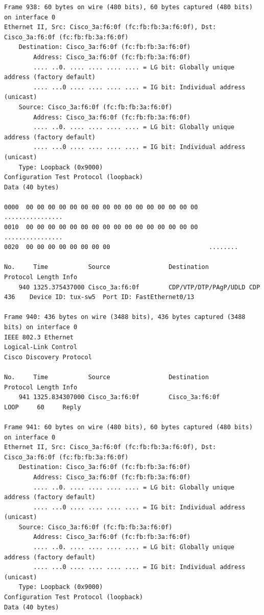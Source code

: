 \documentclass[a4paper,11pt]{article}
\begin{document}
\begin{lstlisting}
Frame 938: 60 bytes on wire (480 bits), 60 bytes captured (480 bits) on interface 0
Ethernet II, Src: Cisco_3a:f6:0f (fc:fb:fb:3a:f6:0f), Dst: Cisco_3a:f6:0f (fc:fb:fb:3a:f6:0f)
    Destination: Cisco_3a:f6:0f (fc:fb:fb:3a:f6:0f)
        Address: Cisco_3a:f6:0f (fc:fb:fb:3a:f6:0f)
        .... ..0. .... .... .... .... = LG bit: Globally unique address (factory default)
        .... ...0 .... .... .... .... = IG bit: Individual address (unicast)
    Source: Cisco_3a:f6:0f (fc:fb:fb:3a:f6:0f)
        Address: Cisco_3a:f6:0f (fc:fb:fb:3a:f6:0f)
        .... ..0. .... .... .... .... = LG bit: Globally unique address (factory default)
        .... ...0 .... .... .... .... = IG bit: Individual address (unicast)
    Type: Loopback (0x9000)
Configuration Test Protocol (loopback)
Data (40 bytes)

0000  00 00 00 00 00 00 00 00 00 00 00 00 00 00 00 00   ................
0010  00 00 00 00 00 00 00 00 00 00 00 00 00 00 00 00   ................
0020  00 00 00 00 00 00 00 00                           ........

No.     Time           Source                Destination           Protocol Length Info
    940 1325.375437000 Cisco_3a:f6:0f        CDP/VTP/DTP/PAgP/UDLD CDP      436    Device ID: tux-sw5  Port ID: FastEthernet0/13  

Frame 940: 436 bytes on wire (3488 bits), 436 bytes captured (3488 bits) on interface 0
IEEE 802.3 Ethernet 
Logical-Link Control
Cisco Discovery Protocol

No.     Time           Source                Destination           Protocol Length Info
    941 1325.834307000 Cisco_3a:f6:0f        Cisco_3a:f6:0f        LOOP     60     Reply

Frame 941: 60 bytes on wire (480 bits), 60 bytes captured (480 bits) on interface 0
Ethernet II, Src: Cisco_3a:f6:0f (fc:fb:fb:3a:f6:0f), Dst: Cisco_3a:f6:0f (fc:fb:fb:3a:f6:0f)
    Destination: Cisco_3a:f6:0f (fc:fb:fb:3a:f6:0f)
        Address: Cisco_3a:f6:0f (fc:fb:fb:3a:f6:0f)
        .... ..0. .... .... .... .... = LG bit: Globally unique address (factory default)
        .... ...0 .... .... .... .... = IG bit: Individual address (unicast)
    Source: Cisco_3a:f6:0f (fc:fb:fb:3a:f6:0f)
        Address: Cisco_3a:f6:0f (fc:fb:fb:3a:f6:0f)
        .... ..0. .... .... .... .... = LG bit: Globally unique address (factory default)
        .... ...0 .... .... .... .... = IG bit: Individual address (unicast)
    Type: Loopback (0x9000)
Configuration Test Protocol (loopback)
Data (40 bytes)


\end{lstlisting}
\end{document}
